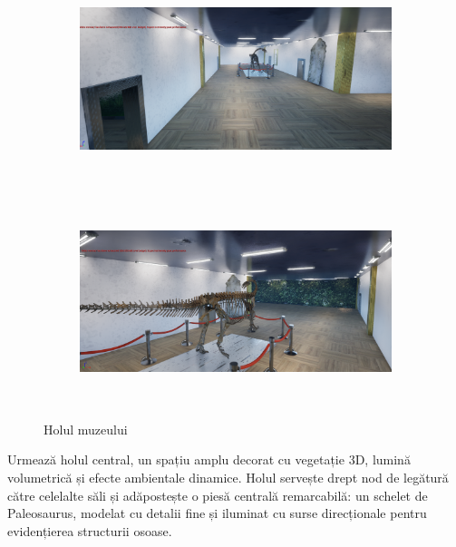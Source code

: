 \begin{figure}[h!]
    \centering
    \begin{subfigure}{0.49\textwidth}
        \includegraphics[width=\linewidth, height=6cm]{continut/capitol3/figuri/hol.png}
        \label{fig:Terrain mapping}
    \end{subfigure}
    \hfill
    \begin{subfigure}{0.49\textwidth}
        \includegraphics[width=\linewidth, height=6cm]{continut/capitol3/figuri/hol2.png}
        \label{fig:Terrain mapping}
    \end{subfigure}
    \caption{Holul muzeului}
\end{figure}

Urmează holul central, un spațiu amplu decorat cu vegetație 3D, lumină volumetrică și efecte ambientale dinamice. Holul servește drept nod de legătură către celelalte săli și adăpostește o piesă centrală remarcabilă: un schelet de Paleosaurus, modelat cu detalii fine și iluminat cu surse direcționale pentru evidențierea structurii osoase.

